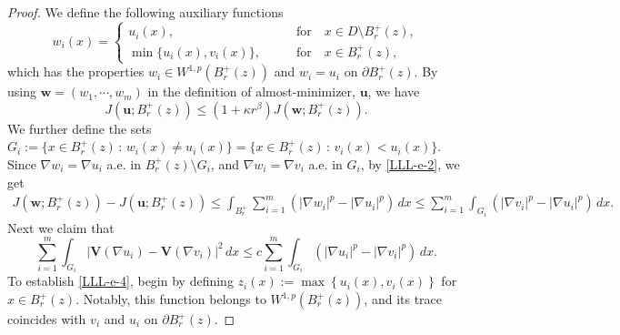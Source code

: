 \documentclass[10pt,a4paper]{amsart}
\begin{document}
\begin{proof}
We define the following auxiliary functions
\begin{equation}
\label{LLL-e-1}
w_i(x)=
\begin{cases}
u_i(x), \qquad & \text{for} \quad x \in D \setminus B_{r}^+(z), \\
\min\{ u_i(x), v_i(x) \}, \qquad & \text{for} \quad x \in B_{r}^+(z),
\end{cases}
\end{equation}
which has the properties
$w_i \in W^{1,p}\left(B_{r}^+(z)\right)$ and  $w_i=u_i$ on $\partial B_{r}^+(z)$. 
By using $\mathbf{w}=(w_1, \cdots, w_m)$ in the definition of almost-minimizer, $\mathbf{u}$, we have
\begin{equation}
\label{LLL-e-2}
J \left(\mathbf{u}; B_{r}^+(z) \right) \leq \left( 1+ \kappa r^{\beta} \right) J \left(\mathbf{w}; B_{r}^+(z) \right).
\end{equation}
We further define the sets $G_i :=\{ x \in B_{r}^+(z) \, : \, w_i(x) \neq u_i(x) \} = \{ x \in B_{r}^+(z) \, : \, v_i(x) < u_i(x)\}$. Since $\nabla w_i = \nabla u_i $ a.e. in $B_{r}^+(z) \setminus G_i$, and $\nabla w_i = \nabla v_i$ a.e. in $G_i$, by \eqref{LLL-e-2}, we get
\begin{align} %
J \left(\mathbf{w}; B_{r}^+(z) \right) - J \left(\mathbf{u}; B_{r}^+(z) \right) %
\leq \int_{B_{r}^+} \sum_{i=1}^{m} \left(|\nabla w_i|^p - |\nabla u_i|^p \right) \, dx %
\label{LLL-e-3}
\leq  \sum_{i=1}^{m} \int_{G_i} \left( |\nabla v_i|^p - |\nabla u_i|^p \right) \, dx. 
\end{align}
Next we claim that 
\begin{equation} 
\label{LLL-e-4} 
 \sum_{i=1}^{m} \int_{G_i} \left| \mathbf{V}(\nabla u_i) - \mathbf{V}(\nabla v_i) \right|^2 \, dx \leq c \sum_{i=1}^{m}  \int_{G_i} \left( \left| \nabla u_i \right|^p - \left| \nabla v_i \right|^p \right) \, dx.
\end{equation}
To establish \eqref{LLL-e-4}, begin by defining $z_i(x):=\max\left\{u_i(x), v_i(x) \right\}$ for $x \in B_{r}^+(z)$. Notably, this function belongs to $W^{1,p}(B_{r}^+(z))$, and its trace coincides with $v_i$ and $u_i$ on $\partial B_{r}^+(z)$.


\end{proof}
\end{document}
